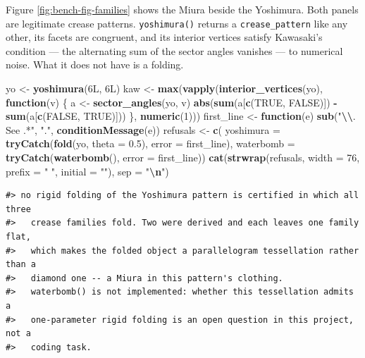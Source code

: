 \documentclass[
  british,
  a4paper,
]{book}
\newenvironment{Shaded}{\begin{snugshade}}{\end{snugshade}}
\newcommand{\AttributeTok}[1]{\textcolor[rgb]{0.13,0.29,0.53}{#1}}
\newcommand{\ConstantTok}[1]{\textcolor[rgb]{0.56,0.35,0.01}{#1}}
\newcommand{\ControlFlowTok}[1]{\textcolor[rgb]{0.13,0.29,0.53}{\textbf{#1}}}
\newcommand{\DataTypeTok}[1]{\textcolor[rgb]{0.13,0.29,0.53}{#1}}
\newcommand{\DecValTok}[1]{\textcolor[rgb]{0.00,0.00,0.81}{#1}}
\newcommand{\FloatTok}[1]{\textcolor[rgb]{0.00,0.00,0.81}{#1}}
\newcommand{\FunctionTok}[1]{\textcolor[rgb]{0.13,0.29,0.53}{\textbf{#1}}}
\newcommand{\NormalTok}[1]{#1}
\newcommand{\OtherTok}[1]{\textcolor[rgb]{0.56,0.35,0.01}{#1}}
\newcommand{\SpecialCharTok}[1]{\textcolor[rgb]{0.81,0.36,0.00}{\textbf{#1}}}
\newcommand{\StringTok}[1]{\textcolor[rgb]{0.31,0.60,0.02}{#1}}
\begin{document}
Figure \ref{fig:bench-fig-families} shows the Miura beside the Yoshimura. Both
panels are legitimate crease patterns. \texttt{yoshimura()} returns a \texttt{crease\_pattern}
like any other, its facets are congruent, and its interior vertices satisfy
Kawasaki's condition --- the alternating sum of the sector angles vanishes --- to
numerical noise. What it does not have is a folding.

\begin{Shaded}
\begin{Highlighting}[]
\NormalTok{yo }\OtherTok{\textless{}{-}} \FunctionTok{yoshimura}\NormalTok{(}\DecValTok{6}\DataTypeTok{L}\NormalTok{, }\DecValTok{6}\DataTypeTok{L}\NormalTok{)}
\NormalTok{kaw }\OtherTok{\textless{}{-}} \FunctionTok{max}\NormalTok{(}\FunctionTok{vapply}\NormalTok{(}\FunctionTok{interior\_vertices}\NormalTok{(yo), }\ControlFlowTok{function}\NormalTok{(v) \{}
\NormalTok{  a }\OtherTok{\textless{}{-}} \FunctionTok{sector\_angles}\NormalTok{(yo, v)}
  \FunctionTok{abs}\NormalTok{(}\FunctionTok{sum}\NormalTok{(a[}\FunctionTok{c}\NormalTok{(}\ConstantTok{TRUE}\NormalTok{, }\ConstantTok{FALSE}\NormalTok{)]) }\SpecialCharTok{{-}} \FunctionTok{sum}\NormalTok{(a[}\FunctionTok{c}\NormalTok{(}\ConstantTok{FALSE}\NormalTok{, }\ConstantTok{TRUE}\NormalTok{)]))}
\NormalTok{\}, }\FunctionTok{numeric}\NormalTok{(}\DecValTok{1}\NormalTok{)))}
\NormalTok{first\_line }\OtherTok{\textless{}{-}} \ControlFlowTok{function}\NormalTok{(e) }\FunctionTok{sub}\NormalTok{(}\StringTok{"}\SpecialCharTok{\textbackslash{}\textbackslash{}}\StringTok{. See .*"}\NormalTok{, }\StringTok{"."}\NormalTok{, }\FunctionTok{conditionMessage}\NormalTok{(e))}
\NormalTok{refusals }\OtherTok{\textless{}{-}} \FunctionTok{c}\NormalTok{(}
  \AttributeTok{yoshimura =} \FunctionTok{tryCatch}\NormalTok{(}\FunctionTok{fold}\NormalTok{(yo, }\AttributeTok{theta =} \FloatTok{0.5}\NormalTok{), }\AttributeTok{error =}\NormalTok{ first\_line),}
  \AttributeTok{waterbomb =} \FunctionTok{tryCatch}\NormalTok{(}\FunctionTok{waterbomb}\NormalTok{(), }\AttributeTok{error =}\NormalTok{ first\_line))}
\FunctionTok{cat}\NormalTok{(}\FunctionTok{strwrap}\NormalTok{(refusals, }\AttributeTok{width =} \DecValTok{76}\NormalTok{, }\AttributeTok{prefix =} \StringTok{"  "}\NormalTok{, }\AttributeTok{initial =} \StringTok{""}\NormalTok{), }\AttributeTok{sep =} \StringTok{"}\SpecialCharTok{\textbackslash{}n}\StringTok{"}\NormalTok{)}
\end{Highlighting}
\end{Shaded}

\begin{verbatim}
#> no rigid folding of the Yoshimura pattern is certified in which all three
#>   crease families fold. Two were derived and each leaves one family flat,
#>   which makes the folded object a parallelogram tessellation rather than a
#>   diamond one -- a Miura in this pattern's clothing.
#>   waterbomb() is not implemented: whether this tessellation admits a
#>   one-parameter rigid folding is an open question in this project, not a
#>   coding task.
\end{verbatim}
\end{document}
